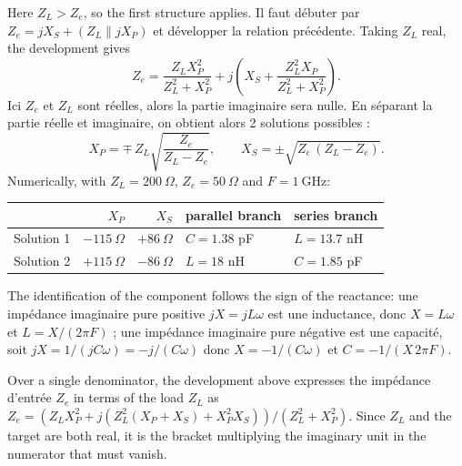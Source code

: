 \begin{example}[$Z_L = 200\ \Omega$ adapté to $Z_e = 50\ \Omega$ at $1\ \mathrm{GHz}$]
  Here $Z_L > Z_e$, so the first structure applies. Il faut débuter par
  $Z_e = jX_S + (Z_L \parallel jX_P)$ et développer la relation précédente. Taking
  $Z_L$ real, the development gives
  \[Z_e = \frac{Z_L X_P^2}{Z_L^2 + X_P^2}
        + j\left(X_S + \frac{Z_L^2 X_P}{Z_L^2 + X_P^2}\right).\]
  Ici $Z_e$ et $Z_L$ sont réelles, alors la partie imaginaire sera nulle. En séparant la
  partie réelle et imaginaire, on obtient alors 2 solutions possibles :
  \[X_P = \mp\, Z_L\sqrt{\frac{Z_e}{Z_L - Z_e}},
    \qquad X_S = \pm\sqrt{Z_e\,(Z_L - Z_e)}.\]
  Numerically, with $Z_L = 200\ \Omega$, $Z_e = 50\ \Omega$ and $F = 1\ \mathrm{GHz}$:
  \begin{center}
    \begin{tabular}{lrrll}
      \toprule
      & $X_P$ & $X_S$ & parallel branch & series branch \\
      \midrule
      Solution 1 & $-115\ \Omega$ & $+86\ \Omega$  & $C = 1.38$ pF & $L = 13.7$ nH \\
      Solution 2 & $+115\ \Omega$ & $-86\ \Omega$  & $L = 18$ nH   & $C = 1.85$ pF \\
      \bottomrule
    \end{tabular}
  \end{center}
  The identification of the component follows the sign of the reactance: une impédance
  imaginaire pure positive $jX = j L \omega$ est une inductance, donc $X = L\omega$ et
  $L = X/(2\pi F)$ ; une impédance imaginaire pure négative est une capacité, soit
  $jX = 1/(jC\omega) = -j/(C\omega)$ donc $X = -1/(C\omega)$ et
  $C = -1/(X\,2\pi F)$.
\end{example}

\begin{remark}
  Over a single denominator, the development above expresses the impédance d'entrée
  $Z_e$ in terms of the load $Z_L$ as
  $Z_e = \left(Z_L X_P^2 + j\left(Z_L^2(X_P + X_S) + X_P^2 X_S\right)\right)/(Z_L^2 + X_P^2)$.
  Since $Z_L$ and the target are both real, it is the bracket multiplying the imaginary
  unit in the numerator that must vanish.
\end{remark}

